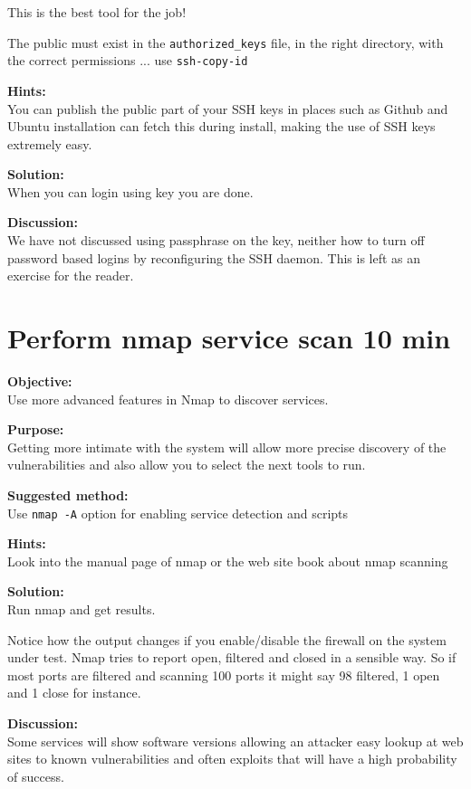 \documentclass[a4paper,11pt,notitlepage]{report}
\begin{document}
\centerline{This is the best tool for the job!}

The public must exist in the \verb+authorized_keys+ file, in the right directory, with the correct permissions ... use \verb+ssh-copy-id+

{\bf Hints:}\\
You can publish the public part of your SSH keys in places such as Github and Ubuntu installation can fetch this during install, making the use of SSH keys extremely easy.

{\bf Solution:}\\
When you can login using key you are done.

{\bf Discussion:}\\
We have not discussed using passphrase on the key, neither how to turn off password based logins by reconfiguring the SSH daemon. This is left as an exercise for the reader.




\chapter{Perform nmap service scan 10 min}
\label{ex:nmap-service}

{\bf Objective:} \\
Use more advanced features in Nmap to discover services.

{\bf Purpose:}\\
Getting more intimate with the system will allow more precise discovery of the vulnerabilities and also allow you to select the next tools to run.

{\bf Suggested method:}\\
Use \verb+nmap -A+ option for enabling service detection and scripts

{\bf Hints:} \\
Look into the manual page of nmap or the web site book about nmap scanning

{\bf Solution:}\\
Run nmap and get results.

Notice how the output changes if you enable/disable the firewall on the system under test. Nmap tries to report open, filtered and closed in a sensible way. So if most ports are filtered and scanning 100 ports it might say 98 filtered, 1 open and 1 close for instance.

{\bf Discussion:}\\
Some services will show software versions allowing an attacker easy lookup at web sites to known vulnerabilities and often exploits that will have a high probability of success.
\end{document}

